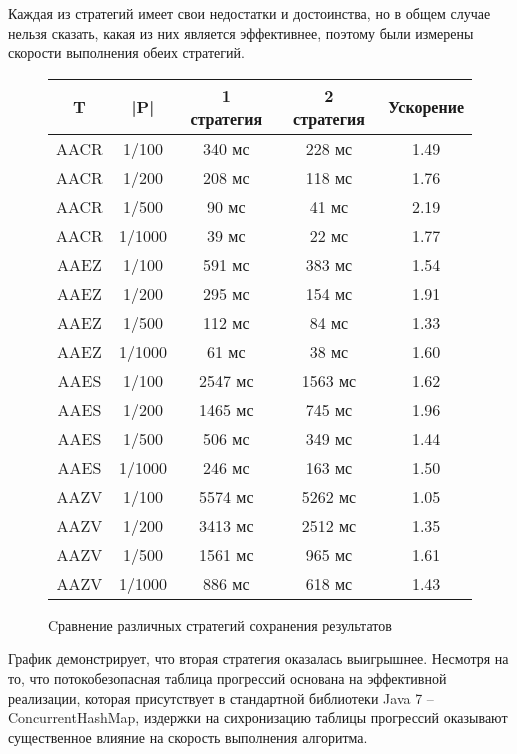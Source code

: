\documentclass[14pt]{article}
\begin{document}
Каждая из стратегий имеет свои недостатки и достоинства, но в общем случае нельзя сказать, какая из них является эффективнее, поэтому были измерены скорости выполнения обеих стратегий.

\begin{figure}
\begin{center}
\begin{tabular}{ | c | c | c | c | c |}
        \hline T & |P| & 1 стратегия & 2 стратегия & Ускорение\\
        \hline AACR & 1/100 & 340 мс & 228 мс & 1.49\\
        \hline AACR & 1/200 & 208 мс & 118 мс & 1.76\\
        \hline AACR & 1/500 & 90 мс & 41 мс & 2.19\\
 		\hline AACR & 1/1000 & 39 мс & 22 мс & 1.77\\
              
        \hline AAEZ & 1/100 & 591 мс & 383 мс & 1.54 \\
        \hline AAEZ & 1/200 & 295 мс & 154 мс & 1.91 \\
        \hline AAEZ & 1/500 & 112 мс & 84 мс & 1.33\\
        \hline AAEZ & 1/1000 & 61 мс & 38 мс & 1.60\\
        
  		\hline AAES & 1/100 & 2547 мс & 1563 мс & 1.62 \\
        \hline AAES & 1/200 & 1465 мс & 745 мс & 1.96 \\
        \hline AAES & 1/500 & 506 мс & 349 мс & 1.44 \\
        \hline AAES & 1/1000 & 246 мс & 163 мс & 1.50 \\
     
  		\hline AAZV & 1/100 & 5574 мс & 5262 мс & 1.05 \\
        \hline AAZV & 1/200 & 3413 мс & 2512 мс & 1.35 \\
        \hline AAZV & 1/500 & 1561 мс & 965 мс & 1.61 \\
        \hline AAZV & 1/1000 & 886 мс & 618 мс & 1.43 \\
     
		\hline
    \end{tabular}
        \end{center}

    \caption{Cравнение различных стратегий сохранения результатов}
    \label{typical_research}
\end{figure}

График демонстрирует, что вторая стратегия оказалась выигрышнее. Несмотря на то, что потокобезопасная таблица прогрессий основана на эффективной реализации, которая присутствует в стандартной библиотеки Java 7 -- ConcurrentHashMap, издержки на сихронизацию таблицы прогрессий оказывают существенное влияние на скорость выполнения алгоритма. 
\end{document}
